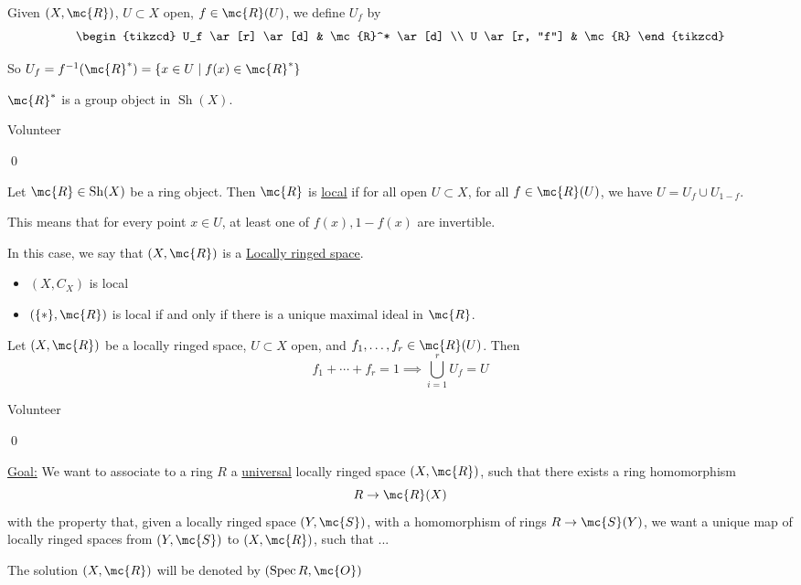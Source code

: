 \documentclass[x11names,reqno,14pt]{extarticle}
\DeclareMathOperator{\Spec}{Spec}
\DeclareMathOperator{\Sh}{Sh}
\begin{document}
Given $(X,\mc{R})$, $U \subset X$ open, $f \in \mc{R}(U)$, we define $U_f$ by 
\[
\begin{tikzcd}
U_f \ar[r] \ar[d] & \mc{R}^* \ar[d] \\
U \ar[r, "f"] & \mc{R}
\end{tikzcd}
\]

So $U_f = f^{-1}(\mc{R}^*) = \{x \in U \mid f(x) \in \mc{R}^*\}$

\claim 

$\mc{R}^*$ is a group object in $\Sh(X)$. 

\proof

Volunteer

\qed


Let $\mc{R} \in \Sh(X)$ be a ring object. Then $\mc{R}$ is \underline{local} if for all open $U \subset X$, for all $f \in \mc{R}(U)$, we have $U = U_f \cup U_{1-f}$.

This means that for every point $x \in U$, at least one of $f(x), 1 - f(x)$ are invertible. 

In this case, we say that $(X,\mc{R})$ is a \underline{Locally ringed space}. 
\exm
\,
\begin{itemize}

\item $(X, C_X)$ is local 

\item $(\{*\},\mc{R})$ is local if and only if there is a unique maximal ideal in $\mc{R}$. 

\end{itemize}

\lem

Let $(X,\mc{R})$ be a locally ringed space, $U \subset X$ open, and $f_1, \dots, f_r \in \mc{R}(U)$. Then
\[
f_1 + \cdots + f_r = 1 \implies \bigcup_{i=1}^r U_f = U
\]

\proof

Volunteer

\qed

\underline{Goal:} We want to associate to a ring $R$ a \underline{universal} locally ringed space $(X,\mc{R})$, such that  there exists a ring homomorphism
\[
R \to \mc{R}(X)
\]
with the property that, given a locally ringed space $(Y,\mc{S})$, with a homomorphism of rings $R\to \mc{S}(Y)$, we want a unique map of locally ringed spaces from $(Y,\mc{S})$ to $(X,\mc{R})$, such that ...

The solution $(X,\mc{R})$ will be denoted by $(\Spec R, \mc{O})$
\end{document}
